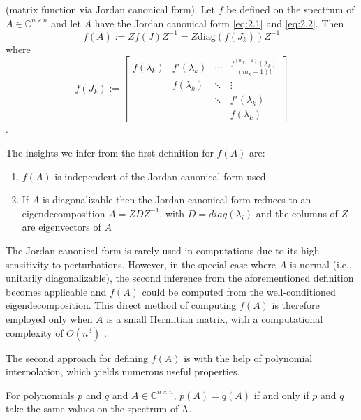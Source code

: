 \begin{definition}
    \label{def:2.3}
    \cite{8}(matrix function via Jordan canonical form). Let $f$ be defined on the spectrum of $A \in \mathbb{C}^{n \times n}$ and let $A$ have the Jordan canonical form \ref{eq:2.1} and \ref{eq:2.2}. Then
    \begin{equation}
        f(A) := Zf(J)Z^{-1} = Z \mathrm{diag}(f(J_k))Z^{-1}
        \label{eq:2.3}
    \end{equation}
    where
    \begin{equation}
        f(J_k) :=
        \begin{bmatrix}
            f(\lambda_k) & f'(\lambda_k) & \cdots & \frac{f^{(m_k-1)}(\lambda_k)}{(m_k-1)!} \\
            & f(\lambda_k) & \ddots & \vdots \\
            & & \ddots & f'(\lambda_k) \\
            & & & f(\lambda_k)
        \end{bmatrix}
        \label{eq:2.4}
    \end{equation}.
\end{definition}

The insights we infer from the first definition for $f(A)$ are:
\begin{enumerate}
    \item $f(A)$ is independent of the Jordan canonical form used.
    \item If $A$ is diagonalizable then the Jordan canonical form reduces to an eigendecomposition $A=ZDZ^{-1}$, with $D=diag(\lambda_i)$ and the columns of $Z$ are eigenvectors of $A$
    \end{enumerate}
    
The Jordan canonical form is rarely used in computations due to its high sensitivity to perturbations. However, in the special case where \( A \) is normal (i.e., unitarily diagonalizable), the second inference from the aforementioned definition becomes applicable and $f(A)$ could be computed from the well-conditioned eigendecomposition. This direct method of computing $f(A)$ is therefore employed only when $A$ is a small Hermitian matrix, with a computational complexity of \( O(n^3) \) \cite{8}. 

The second approach for defining $f(A)$ is with the help of polynomial interpolation, which yields numerous useful properties.

\begin{theorem}
    \label{the:2.4}
    \cite{8}For polynomials $p$ and $q$ and $A \in \mathbb{C}^{n \times n}$, $p(A) = q(A)$ if and only if $p$ and $q$  take the same values on the spectrum of A.
\end{theorem}

